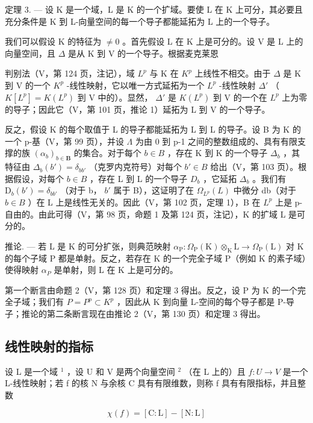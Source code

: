 定理 3. --- 设 K 是一个域，L 是 K 的一个扩域。要使 L 在 K 上可分，其必要且充分条件是 K 到 L-向量空间的每一个导子都能延拓为 L 上的一个导子。

我们可以假设 K 的特征为 \(\neq0\) 。首先假设 L 在 K 上是可分的。设 V 是 L 上的向量空间，且 \(\Delta\) 是从 K 到 V 的一个导子。根据麦克莱恩

判别法（V，第 124 页，注记），域 \(L^p\) 与 K 在 \(K^p\) 上线性不相交。由于 \(\Delta\) 是 K 到 V 的一个 \(K^p\) -线性映射，它以唯一方式延拓为一个 \(L^p\) -线性映射 \(\Delta'\) （\(K[L^p] = K(L^p)\) 到 V 中的）。显然， \(\Delta'\) 是 \(K(L^p)\) 到 V 的一个在 \(L^p\) 上为零的导子；因此它（V，第 101 页，推论 1）延拓为 L 到 V 的一个导子。

反之，假设 K 的每个取值于 L 的导子都能延拓为 L 到 L 的导子。设 B 为 K 的一个 p-基（V，第 99 页），并设 \(\Lambda\) 为由 0 到 p-1 之间的整数组成的、具有有限支撑的族 \((\alpha_{b})_{b\in\mathbf{B}}\) 的集合。对于每个 \(b\in B\) ，存在 K 到 K 的一个导子 \(\Delta_{b}\) ，其特征由 \(\Delta_{b}(b')=\delta_{bb'}\) （克罗内克符号）对每个 \(b'\in B\) 给出（V，第 103 页）。根据假设，对每个 \(b\in B\) ，存在 L 到 L 的一个导子 \(D_{b}\) ，它延拓 \(\Delta_{b}\) 。我们有 \(\mathrm{D}_{b}(b')=\delta_{bb'}\) （对于 b， \(b'\) 属于 B），这证明了在 \(\Omega_{L^{p}}(L)\) 中微分 db（对于 \(b\in B\) ）在 L 上是线性无关的。因此（V，第 102 页，定理 1），B 在 \(L^{p}\) 上是 p-自由的。由此可得（V，第 98 页，命题 1 及第 124 页，注记），K 的扩域 L 是可分的。

推论. --- 若 L 是 K 的可分扩张，则典范映射 \(\alpha_{\mathrm{P}}:\Omega_{\mathrm{P}}(\mathrm{K})\otimes_{\mathrm{K}}\mathrm{L}\to\Omega_{\mathrm{P}}(\mathrm{L})\) 对 K 的每个子域 P 都是单射。反之，若存在 K 的一个完全子域 P（例如 K 的素子域）使得映射 \(\alpha_{P}\) 是单射，则 L 在 K 上是可分的。

第一个断言由命题 2（V，第 128 页）和定理 3 得出。反之，设 P 为 K 的一个完全子域；我们有 \(P = P^{p} \subset K^{p}\) ，因此从 K 到向量 L-空间的每个导子都是 P-导子；推论的第二条断言现在由推论 2（V，第 130 页）和定理 3 得出。

\subsection{线性映射的指标}

设 L 是一个域 \(^{1}\) ，设 U 和 V 是两个向量空间 \(^{2}\) （在 L 上的）且 \(f: U \to V\) 是一个 L-线性映射；若 f 的核 N 与余核 C 具有有限维数，则称 f 具有有限指标，并且整数

\[
\chi (f) = [ \mathrm{C}: \mathrm{L} ] - [ \mathrm{N}: \mathrm{L} ]
\]

